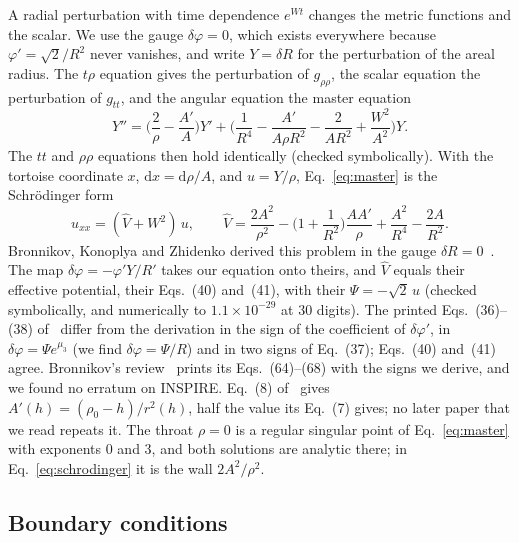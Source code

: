 \documentclass[11pt]{article}
\theoremstyle{plain}
\newcommand{\dd}{\mathrm{d}}
\begin{document}
A radial perturbation with time dependence $e^{Wt}$ changes the metric functions and the scalar. We use the gauge
$\delta\varphi=0$, which exists everywhere because $\varphi'=\sqrt2/R^2$ never vanishes, and write $Y=\delta R$ for the
perturbation of the areal radius. The $t\rho$ equation gives the perturbation of $g_{\rho\rho}$, the scalar equation the
perturbation of $g_{tt}$, and the angular equation the master equation
\begin{equation}
Y''=\Big(\frac2\rho-\frac{A'}A\Big)Y'+\Big(\frac1{R^4}-\frac{A'}{A\rho R^2}-\frac2{AR^2}+\frac{W^2}{A^2}\Big)Y .\label{eq:master}
\end{equation}
The $tt$ and $\rho\rho$ equations then hold identically (checked symbolically). With the tortoise coordinate $x$,
$\dd x=\dd\rho/A$, and $u=Y/\rho$, Eq.~\eqref{eq:master} is the Schrödinger form
\begin{equation}
u_{xx}=(\hat V+W^2)\,u,\qquad
\hat V=\frac{2A^2}{\rho^2}-\Big(1+\frac1{R^2}\Big)\frac{AA'}{\rho}+\frac{A^2}{R^4}-\frac{2A}{R^2}.\label{eq:schrodinger}
\end{equation}
Bronnikov, Konoplya and Zhidenko derived this problem in the gauge $\delta R=0$~\cite{BKZ12}. The map
$\delta\varphi=-\varphi'Y/R'$ takes our equation onto theirs, and $\hat V$ equals their effective potential, their
Eqs.~(40) and~(41), with their $\Psi=-\sqrt2\,u$ (checked symbolically, and numerically to $1.1\times10^{-29}$ at 30 digits).
The printed Eqs.~(36)--(38) of~\cite{BKZ12} differ from the derivation in the sign of the coefficient of
$\delta\varphi'$, in $\delta\varphi=\Psi e^{\mu_3}$ (we find $\delta\varphi=\Psi/R$) and in two signs of Eq.~(37); Eqs.~(40)
and~(41) agree. Bronnikov's review~\cite{Bro18} prints its Eqs.~(64)--(68) with the signs we derive, and we found no erratum
on INSPIRE. Eq.~(8) of~\cite{BF06} gives $A'(h)=(\rho_0-h)/r^2(h)$, half the value its Eq.~(7) gives; no later paper
that we read repeats it.
The throat $\rho=0$ is a regular singular point of Eq.~\eqref{eq:master} with exponents $0$ and $3$, and both solutions are
analytic there; in Eq.~\eqref{eq:schrodinger} it is the wall $2A^2/\rho^2$.

\subsection{Boundary conditions}\label{sec:bc}
\end{document}
